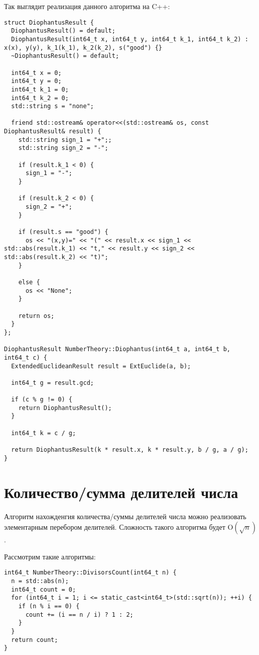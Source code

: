 \documentclass[12pt, a4paper, openany]{book}
\begin{document}
\newpage
\noindent
Так выглядит реализация данного алгоритма на C++:

\begin{lstlisting}[breaklines=true]
struct DiophantusResult {
  DiophantusResult() = default;
  DiophantusResult(int64_t x, int64_t y, int64_t k_1, int64_t k_2) : x(x), y(y), k_1(k_1), k_2(k_2), s("good") {}
  ~DiophantusResult() = default;

  int64_t x = 0;
  int64_t y = 0;
  int64_t k_1 = 0;
  int64_t k_2 = 0;
  std::string s = "none";

  friend std::ostream& operator<<(std::ostream& os, const DiophantusResult& result) {
    std::string sign_1 = "+";;
    std::string sign_2 = "-";

    if (result.k_1 < 0) {
      sign_1 = "-";
    }

    if (result.k_2 < 0) {
      sign_2 = "+";
    }

    if (result.s == "good") {
      os << "(x,y)=" << "(" << result.x << sign_1 << std::abs(result.k_1) << "t," << result.y << sign_2 << std::abs(result.k_2) << "t)";
    }

    else {
      os << "None";
    }

    return os;
  }
};

DiophantusResult NumberTheory::Diophantus(int64_t a, int64_t b, int64_t c) {
  ExtendedEuclideanResult result = ExtEuclide(a, b);

  int64_t g = result.gcd;

  if (c % g != 0) {
    return DiophantusResult(); 
  }

  int64_t k = c / g;

  return DiophantusResult(k * result.x, k * result.y, b / g, a / g);
}
\end{lstlisting}

\section{Количество/сумма делителей числа}

Алгоритм нахожденгия количества/суммы делителей числа можно реализовать элементарным перебором делителей. Сложность такого алгоритма будет $\text{O}(\sqrt{n})$. 

\noindent
Рассмотрим такие алгоритмы:

\begin{lstlisting}[breaklines=true]
int64_t NumberTheory::DivisorsCount(int64_t n) {
  n = std::abs(n);
  int64_t count = 0;
  for (int64_t i = 1; i <= static_cast<int64_t>(std::sqrt(n)); ++i) {
    if (n % i == 0) {
      count += (i == n / i) ? 1 : 2;
    }
  }
  return count;
}
\end{lstlisting}
\end{document}
